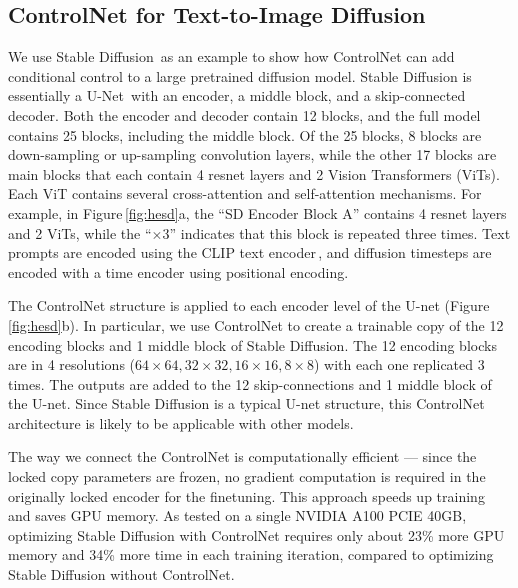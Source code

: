 	\subsection{ControlNet for Text-to-Image Diffusion}
	\label{sec:controldiff}

	We use Stable Diffusion\,\cite{rombach2021highresolution} as an example to show how ControlNet can add conditional control to a large pretrained diffusion model.  Stable Diffusion is essentially a
	U-Net\,\cite{ronneberger2015u} with an encoder, a middle block, and a skip-connected decoder. Both the encoder and decoder contain 12 blocks, and the full model contains 25 blocks, including the middle block. Of the 25 blocks, 8 blocks are down-sampling or up-sampling convolution layers, while the other 17 blocks are main blocks that each contain 4 resnet layers and 2 Vision Transformers (ViTs).  Each ViT contains several cross-attention and self-attention mechanisms. For example, in Figure\,\ref{fig:hesd}a, the ``SD Encoder Block A'' contains 4 resnet layers and 2 ViTs, while the 
	``$\times 3$'' indicates that this block is repeated three times. Text prompts are encoded using the CLIP text encoder\,\cite{radford2021learning}, and diffusion timesteps are encoded with a time encoder using positional encoding.

	The ControlNet structure is applied to each encoder level of the U-net
	(Figure\,\ref{fig:hesd}b).  In particular, we use ControlNet to create a trainable copy of the 12 encoding blocks and 1 middle block of Stable Diffusion. The 12 encoding blocks are in 4 resolutions
	($64\times64,32\times32,16\times16,8\times8$) with each one replicated 3 times.  The outputs are added to the 12 skip-connections and 1 middle block of the U-net.  Since Stable Diffusion is a typical U-net structure, this ControlNet architecture is likely to be applicable with other models.

	The way we connect the ControlNet is computationally efficient --- since the locked copy parameters are frozen, no gradient computation is required in the originally locked encoder for the finetuning.  This approach speeds up training and saves GPU memory. As tested on a single NVIDIA A100 PCIE 40GB, optimizing Stable Diffusion with ControlNet requires only about 23\% more GPU memory and 34\% more time in each training iteration, compared to optimizing Stable Diffusion without ControlNet.

